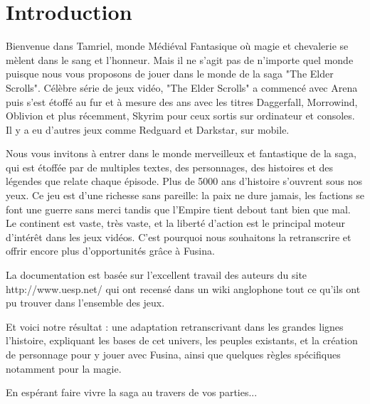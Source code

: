\chapter{Introduction}

Bienvenue dans Tamriel, monde Médiéval Fantasique où magie et chevalerie se mèlent dans le sang et l'honneur. Mais il ne s'agit pas de n'importe quel monde puisque nous vous proposons de jouer dans le monde de la saga "The Elder Scrolls". Célèbre série de jeux vidéo, "The Elder Scrolls" a commencé avec Arena puis s'est étoffé au fur et à mesure des ans avec les titres Daggerfall, Morrowind, Oblivion et plus récemment, Skyrim pour ceux sortis sur ordinateur et consoles. Il y a eu d’autres jeux comme Redguard et Darkstar, sur mobile.

Nous vous invitons à entrer dans le monde merveilleux et fantastique de la saga, qui est étoffée par de multiples textes, des personnages, des histoires et des légendes que relate chaque épisode. Plus de 5000 ans d’histoire s’ouvrent sous nos yeux. Ce jeu est d’une richesse sans pareille: la paix ne dure jamais, les factions se font une guerre sans merci tandis que l’Empire tient debout tant bien que mal. Le continent est vaste, très vaste, et la liberté d’action est le principal moteur d’intérêt dans les jeux vidéos. C’est pourquoi nous souhaitons la retranscrire et offrir encore plus d’opportunités grâce à Fusina.

La documentation est basée sur l’excellent travail des auteurs du site http://www.uesp.net/ qui ont recensé dans un wiki anglophone tout ce qu’ils ont pu trouver dans l’ensemble des jeux.

Et voici notre résultat : une adaptation retranscrivant dans les grandes lignes l’histoire, expliquant les bases de cet univers, les peuples existants, et la création de personnage pour y jouer avec Fusina, ainsi que quelques règles spécifiques notamment pour la magie.

En espérant faire vivre la saga au travers de vos parties...